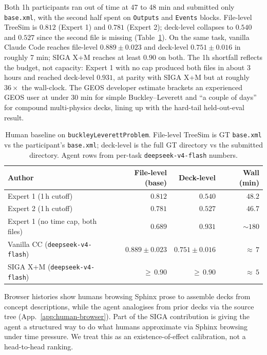 \documentclass{article}
\begin{document}
Both 1h participants ran out of time at 47 to 48 min and submitted only \texttt{base.xml}, with the second half spent on \texttt{Outputs} and \texttt{Events} blocks. File-level TreeSim is $0.812$ (Expert 1) and $0.781$ (Expert 2); deck-level collapses to $0.540$ and $0.527$ since the second file is missing (Table~\ref{tab:human-baseline}). On the same task, vanilla Claude Code reaches file-level $0.889 \pm 0.023$ and deck-level $0.751 \pm 0.016$ in roughly 7 min; SIGA X+M reaches at least $0.90$ on both. The 1h shortfall reflects the budget, not capacity: Expert 1 with no cap produced both files in about 3 hours and reached deck-level $\mathbf{0.931}$, at parity with SIGA X+M but at roughly $36\times$ the wall-clock. The GEOS developer estimate brackets an experienced GEOS user at under 30 min for simple Buckley--Leverett and ``a couple of days'' for compound multi-physics decks, lining up with the hard-tail held-out-eval result.

\begin{table}[h]
  \caption{Human baseline on \texttt{buckleyLeverettProblem}. File-level TreeSim is GT \texttt{base.xml} vs the participant's \texttt{base.xml}; deck-level is the full GT directory vs the submitted directory. Agent rows from per-task \texttt{deepseek-v4-flash} numbers.}
  \label{tab:human-baseline}
  \centering
  \small
  \begin{tabular}{lrrr}
    \toprule
    \textbf{Author} & \textbf{File-level (base)} & \textbf{Deck-level} & \textbf{Wall (min)} \\
    \midrule
    Expert 1 (1\,h cutoff)                          & $0.812$            & $0.540$            & $48.2$ \\
    Expert 2 (1\,h cutoff)                          & $0.781$            & $0.527$            & $46.7$ \\
    Expert 1 (no time cap, both files)              & $0.689$            & $0.931$            & ${\sim}180$ \\
    Vanilla CC (\texttt{deepseek-v4-flash})   & $0.889 \pm 0.023$  & $0.751 \pm 0.016$  & ${\approx}\,7$ \\
    SIGA X+M (\texttt{deepseek-v4-flash})     & ${\geq}\,0.90$     & ${\geq}\,0.90$     & ${\approx}\,5$ \\
    \bottomrule
  \end{tabular}
\end{table}

Browser histories show humans browsing Sphinx prose to assemble decks from concept descriptions, while the agent analogises from prior decks via the source tree (App.~\ref{app:human-browser}). Part of the SIGA contribution is giving the agent a structured way to do what humans approximate via Sphinx browsing under time pressure. We treat this as an existence-of-effect calibration, not a head-to-head ranking.
\end{document}
